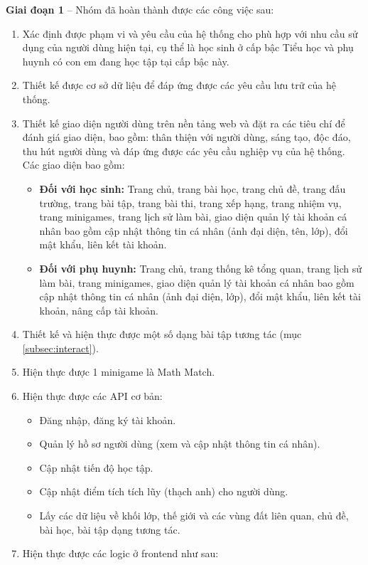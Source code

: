 \vspace{0.2cm}
\noindent\textbf{Giai đoạn 1} -- Nhóm đã hoàn thành được các công việc sau:
\begin{enumerate}
	\item Xác định được phạm vi và yêu cầu của hệ thống cho phù hợp với nhu cầu sử dụng của người dùng hiện tại, cụ thể là học sinh ở cấp bậc Tiểu học và phụ huynh có con em đang học tập tại cấp bậc này. 
	\item Thiết kế được cơ sở dữ liệu để đáp ứng được các yêu cầu lưu trữ của hệ thống.
	\item Thiết kế giao diện người dùng trên nền tảng web và đặt ra các tiêu chí để đánh giá giao diện, bao gồm: thân thiện với người dùng, sáng tạo, độc đáo, thu hút người dùng và đáp ứng được các yêu cầu nghiệp vụ của hệ thống. Các giao diện bao gồm:
	\begin{itemize}
		\item \textbf{Đối với học sinh:} Trang chủ, trang bài học, trang chủ đề, trang đấu trường, trang bài tập, trang bài thi, trang xếp hạng, trang nhiệm vụ, trang minigames, trang lịch sử làm bài, giao diện quản lý tài khoản cá nhân bao gồm cập nhật thông tin cá nhân (ảnh đại diện, tên, lớp), đổi mật khẩu, liên kết tài khoản. 
		\item \textbf{Đối với phụ huynh:} Trang chủ, trang thống kê tổng quan, trang lịch sử làm bài, trang minigames, giao diện quản lý tài khoản cá nhân bao gồm cập nhật thông tin cá nhân (ảnh đại diện, lớp), đổi mật khẩu, liên kết tài khoản, nâng cấp tài khoản.
	\end{itemize}
	\item Thiết kế và hiện thực được một số dạng bài tập tương tác (mục \ref{subsec:interact}).
	\item Hiện thực được 1 minigame là Math Match.
	\item Hiện thực được các API cơ bản: 
	\begin{itemize}
		\item Đăng nhập, đăng ký tài khoản.
		\item Quản lý hồ sơ người dùng (xem và cập nhật thông tin cá nhân).
		\item Cập nhật tiến độ học tập.
		\item Cập nhật điểm tích tích lũy (thạch anh) cho người dùng.
		\item Lấy các dữ liệu về khối lớp, thế giới và các vùng đất liên quan, chủ đề, bài học, bài tập dạng tương tác.
	\end{itemize}
	\item Hiện thực được các logic ở frontend như sau:

\end{enumerate}

